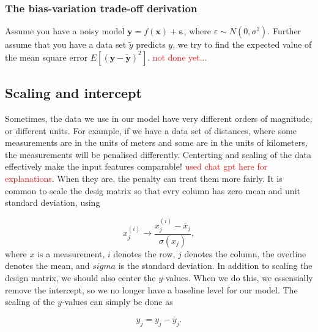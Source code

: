 \subsubsection{The bias-variation trade-off derivation}
Assume you have a noisy model $\mathbf{y}=f(\mathbf{x})+\boldsymbol{\varepsilon}$, where $\varepsilon \sim N(0, \sigma^2)$. Further assume that you have a data set $\tilde{y}$ predicts $y$, we try to find the expected value of the mean square error $\displaystyle E[(\mathbf{y}-\mathbf{\tilde{y}})^2]$. \textcolor{red}{not done yet...}

\subsection{Scaling and intercept}\label{eq:scaling_and_intercept}
Sometimes, the data we use in our model have very different orders of magnitude, or different units. For example, if we have a data set of distances, where some measurements are in the units of meters and some are in the units of kilometers, the measurements will be penalised differently. Centerting and scaling of the data effectively make the input features comparable! \textcolor{red}{used chat gpt here for explanations}. When they are, the penalty can treat them more fairly. It is common to scale the desig matrix so that evry column has zero mean and unit standard deviation, using

\begin{equation}\label{eq:scaling_X}
    x_j^{(i)} \rightarrow \frac{x_j^{(i)}-\overline{x}_j}{\sigma(x_j)},
\end{equation}
where $x$ is a measurement, $i$ denotes the row, $j$ denotes the column, the overline denotes the mean, and $sigma$ is the standard deviation. In addition to scaling the design matrix, we should also center the $y$-values. When we do this, we essensially remove the intercept, so we no longer have a baseline level for our model. The scaling of the $y$-values can simply be done as

\begin{equation}\label{eq:centering_y}
    y_j = y_j - \overline{y}_j.
\end{equation}